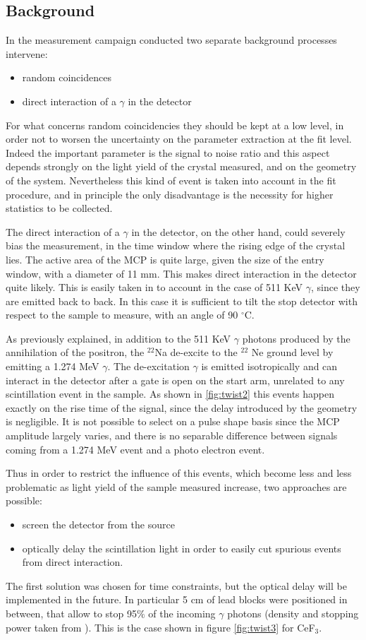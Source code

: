 \subsection{Background}
In the measurement campaign conducted two separate background processes intervene:
\begin{itemize}
\item random coincidences
\item direct interaction of a $\gamma$ in the detector
\end{itemize}
For what concerns random coincidencies they should be kept at a low level, in order not to worsen the uncertainty on the parameter extraction at the fit level. Indeed the important parameter is the signal to noise ratio and this aspect depends strongly on the light yield of the crystal measured, and on the geometry of the system. Nevertheless this kind of event is taken into account in the fit procedure, and in principle the only disadvantage is the necessity for higher statistics to be collected.

The direct interaction of a $\gamma$ in the detector, on the other hand, could severely bias the measurement, in the time window where the rising edge of the crystal lies. 
The active area of the MCP is quite large, given the size of the entry window, with a diameter of 11 mm. This makes direct interaction in the detector quite likely.
This is easily taken in to account in the case of 511 KeV $\gamma$, since they are emitted back to back. In this case it is sufficient to tilt the stop detector with respect to the sample to measure, with an angle of 90 $^{\circ}$C.

As previously explained, in addition to the 511 KeV $\gamma$ photons produced by the annihilation of the positron, the $^{22}$Na de-excite to the $^{22}$ Ne ground level by emitting a 1.274 MeV $\gamma$. 
The de-excitation $\gamma$ is emitted isotropically and can interact in the detector after a gate is open on the start arm, unrelated to any scintillation event in the sample.
As shown in \ref{fig:twist2} this events happen exactly on the rise time of the signal, since the delay introduced by the geometry is negligible.
It is not possible to select on a pulse shape basis since the MCP amplitude largely varies, and there is no separable difference between signals coming from a 1.274 MeV event and a photo electron event.

Thus in order to restrict the influence of this events, which become less and less problematic as light yield of the sample measured increase, two approaches are possible:
\begin{itemize}
\item screen the detector from the source
\item optically delay the scintillation light in order to easily cut spurious events from direct interaction.
\end{itemize}
The first solution was chosen for time constraints, but the optical delay will be implemented in the future. In particular 5 cm of lead blocks were positioned in between, that allow to stop 95$\%$ of the incoming $\gamma$ photons (density and stopping power taken from \cite{nist2005}). This is the case shown in figure \ref{fig:twist3} for CeF$_{3}$.

